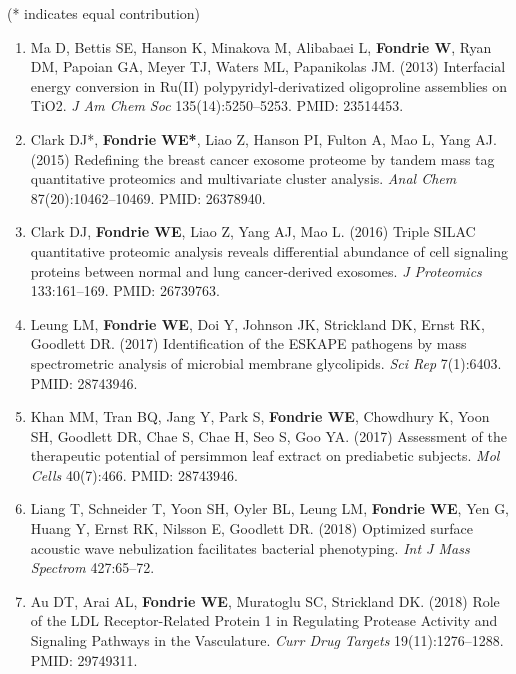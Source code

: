 \documentclass{article}
\newcommand{\mysection}[1]{\vspace{1ex}{\bf #1}}
\begin{document}
\mysection{Refereed Publications} (* indicates equal contribution)
\begin{enumerate}
  \item Ma D, Bettis SE, Hanson K, Minakova M, Alibabaei L, {\bf Fondrie W},
    Ryan DM, Papoian GA, Meyer TJ, Waters ML, Papanikolas JM. (2013) Interfacial
    energy conversion in Ru(II) polypyridyl-derivatized oligoproline assemblies
    on TiO2. \textit{J Am Chem Soc} 135(14):5250--5253. PMID: 23514453. 

  \item Clark DJ*, {\bf Fondrie WE*}, Liao Z, Hanson PI, Fulton A, Mao L, Yang
    AJ. (2015) Redefining the breast cancer exosome proteome by tandem mass tag
    quantitative proteomics and multivariate cluster analysis. \textit{Anal
      Chem} 87(20):10462--10469. PMID: 26378940. 

  \item Clark DJ, {\bf Fondrie WE}, Liao Z, Yang AJ, Mao L. (2016) Triple SILAC
    quantitative proteomic analysis reveals differential abundance of cell
    signaling proteins between normal and lung cancer-derived exosomes. {\it J
      Proteomics} 133:161--169. PMID: 26739763. 

  \item Leung LM, {\bf Fondrie WE}, Doi Y, Johnson JK, Strickland DK, Ernst RK,
    Goodlett DR. (2017) Identification of the ESKAPE pathogens by mass
    spectrometric analysis of microbial membrane glycolipids. {\it Sci Rep}
    7(1):6403. PMID: 28743946. 

  \item Khan MM, Tran BQ, Jang Y, Park S, {\bf Fondrie WE}, Chowdhury K, Yoon
    SH, Goodlett DR, Chae S, Chae H, Seo S, Goo YA. (2017) Assessment of the
    therapeutic potential of persimmon leaf extract on prediabetic subjects.
    {\it Mol Cells} 40(7):466. PMID: 28743946. 

  \item Liang T, Schneider T, Yoon SH, Oyler BL, Leung LM, \textbf{Fondrie WE},
    Yen G, Huang Y, Ernst RK, Nilsson E, Goodlett DR. (2018) Optimized surface
    acoustic wave nebulization facilitates bacterial phenotyping. \textit{Int J
      Mass Spectrom} 427:65--72. 

  \item Au DT, Arai AL, \textbf{Fondrie WE}, Muratoglu SC, Strickland DK. (2018)
    Role of the LDL Receptor-Related Protein 1 in Regulating Protease Activity
    and Signaling Pathways in the Vasculature. \textit{Curr Drug Targets}
    19(11):1276--1288. PMID: 29749311. 


\end{enumerate}
\end{document}
